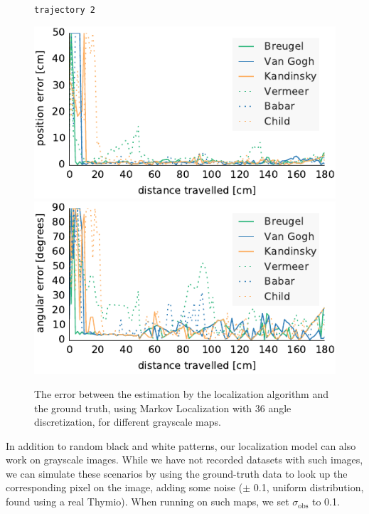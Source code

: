 \documentclass[letterpaper, 10pt, conference]{ieeeconf}
\begin{document}
\begin{figure}
\begin{center}
\texttt{trajectory~2}
\end{center}
\includegraphics{ml-grayscale_images-random_2-xy}\hfill
\includegraphics{ml-grayscale_images-random_2-theta}

\caption{The error between the estimation by the localization algorithm and the ground truth, using Markov Localization with 36 angle discretization, for different grayscale maps.}
\label{fig:grayscale}
\end{figure}

In addition to random black and white patterns, our localization model can also work on grayscale images.
While we have not recorded datasets with such images, we can simulate these scenarios by using the ground-truth data to look up the corresponding pixel on the image, adding some noise ($\pm$ 0.1, uniform distribution, found using a real Thymio).
When running on such maps, we set $\sigma_\mathrm{obs}$ to 0.1.
\end{document}
